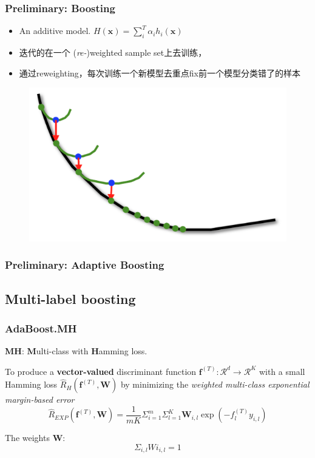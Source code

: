 \documentclass{beamer}
\begin{document}
\begin{frame}
\frametitle{Preliminary: Boosting}
\begin{itemize}
\item An additive model. $H(\mathbf{x}) = \sum_i^T \alpha_i h_i(\mathbf{x})$
\item 迭代的在一个 (\textit{re-})weighted sample set上去训练，
\item 通过reweighting，每次训练一个新模型去重点fix前一个模型分类错了的样本
\end{itemize}

\begin{figure}
\includegraphics[width=.5\linewidth]{img/boosting.png}
\end{figure}
\end{frame}

\begin{frame}
\frametitle{Preliminary: Adaptive Boosting}

\begin{algorithm}[H]
\end{algorithm}

\end{frame}

\subsection{Multi-label boosting}

\begin{frame}
\frametitle{AdaBoost.MH}
\begin{block}{}
\textbf{MH}: \textbf{M}ulti-class with \textbf{H}amming loss.
\end{block}
To produce a \textbf{vector-valued} discriminant function $\mathbf{f}^{(T)} : \mathcal{R}^d \rightarrow \mathcal{R}^K$ with a small Hamming loss $\hat{R}_H (\mathbf{f}^{(T)}, \mathbf{W})$ by minimizing the \textit{weighted multi-class exponential margin-based error}
$$\hat{R}_{EXP}(\mathbf{f}^{(T)}, \mathbf{W}) = \frac{1}{mK} {{\Sigma}_{i=1}^m} {{\Sigma}_{l=1}^K} {\mathbf{W}_{i,l}\exp(- f_l^{(T)} y_{i,l})}$$

The weights $\mathbf{W}$:
$${\Sigma}_{i,l} Wi_{i, l} = 1$$
\end{frame}
\end{document}
